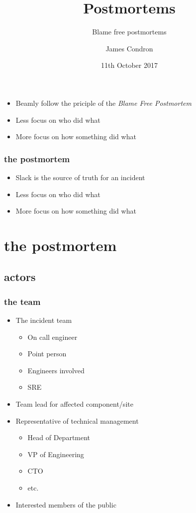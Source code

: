 \documentclass[]{beamer}
\title[postmortems]{Postmortems}
\subtitle{Blame free postmortems}
\author[jspc]{James Condron}
\institute[Beamly]{
  Beamly \\
  Site Reliability Team
}
\date{11th October 2017}
\begin{document}
\begin{frame}
  \titlepage
\end{frame}

\begin{frame}
  \frametitle{}

  \begin{itemize}[<+->]
  \item Beamly follow the priciple of the \textit{Blame Free Postmortem}
  \item Less focus on who did what
  \item More focus on how something did what
  \end{itemize}
\end{frame}

\begin{frame}
  \frametitle{the postmortem}

  \begin{itemize}[<+->]
  \item Slack is the source of truth for an incident
  \item Less focus on who did what
  \item More focus on how something did what
  \end{itemize}
\end{frame}

\section{the postmortem}
\subsection{actors}
\begin{frame}
  \frametitle{the team}

  \begin{itemize}
  \item The incident team
    \begin{itemize}
    \item On call engineer
    \item Point person
    \item Engineers involved
    \item SRE
    \end{itemize}

  \item Team lead for affected component/site
  \item Representative of technical management
    \begin{itemize}
    \item Head of Department
    \item VP of Engineering
    \item CTO
    \item etc.
    \end{itemize}

  \item Interested members of the public
  \end{itemize}
\end{frame}
\end{document}
